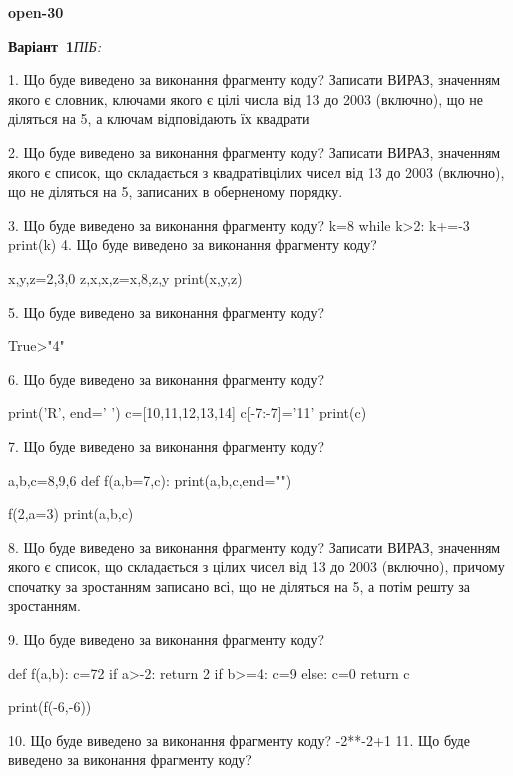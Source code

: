 \documentclass[11pt]{article}
\begin{document}
{\large\textbf{open-30}}

\textbf{Варіант \No\,1}\hfill \textit{ПІБ:}\,\underline{\hspace{60mm}}
\vspace{4mm}

1. Що буде виведено за виконання фрагменту коду?
Записати ВИРАЗ, значенням якого є словник, ключами якого є цілі числа від 13 до 2003 (включно), що не діляться на 5, а ключам відповідають їх квадрати 

2. Що буде виведено за виконання фрагменту коду?
Записати ВИРАЗ, значенням якого є список, що складається з квадратівцілих чисел від 13 до 2003 (включно), що не діляться на 5, записаних в обернено\-му порядку.

3. Що буде виведено за виконання фрагменту коду?
k=8
   while k>2: k+=-3
   print(k)
4. Що буде виведено за виконання фрагменту коду?

x,y,z=2,3,0
z,x,x,z=x,8,z,y
print(x,y,z)

5. Що буде виведено за виконання фрагменту коду?

True>"4"

6. Що буде виведено за виконання фрагменту коду?

print('R', end=' ')
c=[10,11,12,13,14]
c[-7:-7]='11'
print(c)


7. Що буде виведено за виконання фрагменту коду?

a,b,c=8,9,6
def f(a,b=7,c):
    print(a,b,c,end="")

f(2,a=3)
print(a,b,c)


8. Що буде виведено за виконання фрагменту коду?
Записати ВИРАЗ, значенням якого є список, що складається з цілих чисел від 13 до 2003 (включно), причому спочатку за зростанням записано всі, що не діляться на 5, а потім решту за зростанням.

9. Що буде виведено за виконання фрагменту коду?

def f(a,b):
    c=72
    if a>-2:
        return 2
    if b>=4:
         c=9
    else: 
        c=0
    return c

print(f(-6,-6))

10. Що буде виведено за виконання фрагменту коду?
-2**-2+1
11. Що буде виведено за виконання фрагменту коду?
\end{document}
